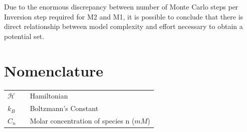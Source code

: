 \documentclass[10pt,a4paper,twoside]{article}
\begin{document}
 Due to the enormous discrepancy between number of Monte Carlo steps per Inversion step required for M2 and M1, it is possible to conclude that there is direct relationship between model complexity and effort necessary to obtain a potential set.
 
\section{Nomenclature} 
   \begin{tabulary}{1.0\textwidth}{LCL}
   $\mathcal{H}$ &   & Hamiltonian \\
   $k_B$ & & Boltzmann's Constant\\
   $C_n$ &   & Molar concentration of species n ($mM$) \\
   \end{tabulary}


\vfill
\newpage
\end{document}
